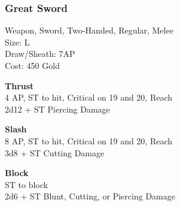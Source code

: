 \subsubsection{Great Sword}\label{weapon:greatSword}
Weapon, Sword, Two-Handed, Regular, Melee\\
Size: L\\
Draw/Sheath: 7AP\\
Cost: 450 Gold

\textbf{Thrust}\\
4 AP, ST to hit, Critical on 19 and 20,  Reach\\
2d12 + \texttimes ST Piercing Damage

\textbf{Slash}\\
8 AP, ST to hit, Critical on 19 and 20,  Reach\\
3d8 + \texttimes ST Cutting Damage

\textbf{Block}\\
ST to block\\
2d6 + \texttimes ST Blunt, Cutting, or Piercing Damage